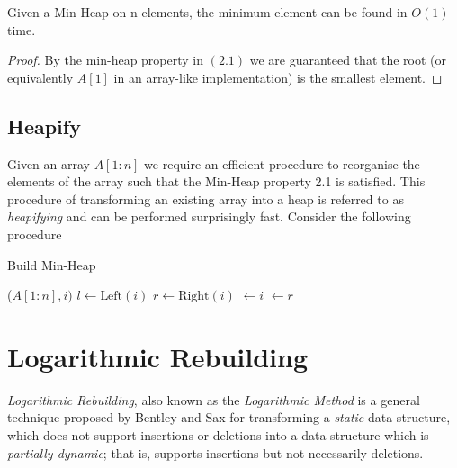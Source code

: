 \begin{lemma}
    Given a Min-Heap on n elements, the minimum element can be found in $O(1)$ time.
\end{lemma}
\begin{proof}
    By the min-heap property in $(2.1)$ we are guaranteed that the root (or equivalently $A[1]$ in an array-like implementation) is the smallest element. 
\end{proof}

\subsection{Heapify}
\label{ssec:heapify}

Given an array $A[1:n]$ we require an efficient procedure to reorganise the elements of the array such that the Min-Heap property 2.1 is satisfied. This procedure of transforming an existing array into a heap is referred to as \textit{heapifying} and can be performed surprisingly fast. Consider the following procedure

\begin{algorithm}
\caption{Build Min-Heap}\label{alg:heapify}
\begin{algorithmic}[1]
\State {}($A[1:n], i)$
\EndFor
\EndProcedure
\State
\State
{}
\State $l\gets \text{Left}(i)$
\State $r\gets \text{Right}(i)$
\State {} $\gets i$
\EndIf
{}
\State {} $\gets r$
\EndIf
{}
\State{}
\State{}
\EndIf
\EndProcedure



\end{algorithmic}
\end{algorithm}



\section{Logarithmic Rebuilding}
\label{sec:logarithmic-rebuilding}

\textit{Logarithmic Rebuilding}, also known as the \textit{Logarithmic Method} is a general technique proposed by Bentley and Sax \cite{BENTLEY1980301} for transforming a \textit{static} data structure, which does not support insertions or deletions into a data structure which is \textit{partially dynamic}; that is, supports insertions but not necessarily deletions.

